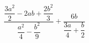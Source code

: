 \begin{ex}[type=expression]
	\begin{condition}
		\( \dfrac{\dfrac{3a^2}{2}-2ab+\dfrac{2b^2}{3}}{\dfrac{a^2}{4}-\dfrac{b^2}{9}}+\dfrac{6b}{\dfrac{3a}{4}+\dfrac{b}{2}} \)
	\end{condition}
\end{ex}